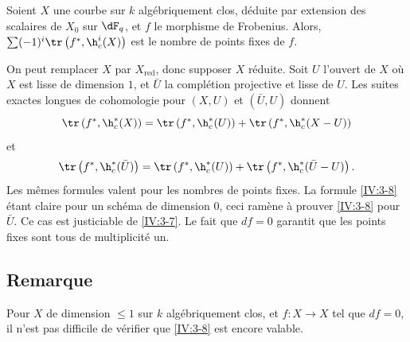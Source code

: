 \begin{corollary_}\label{IV:3-8}
Soient $X$ une courbe sur $k$ algébriquement clos, déduite par extension des 
scalaires de $X_0$ sur $\dF_q$, et $f$ le morphisme de Frobenius. Alors, 
$\sum (-1)^i \tr\left(f^\ast,\h_c^i(X)\right)$ est le nombre de points 
fixes de $f$.
\end{corollary_}

On peut remplacer $X$ par $X_\text{red}$, donc supposer $X$ réduite. Soit $U$ 
l'ouvert de $X$ où $X$ est lisse de dimension $1$, et $\bar U$ la 
complétion projective et lisse de $U$. Les suites exactes longues de 
cohomologie pour $(X,U)$ et $(\bar U,U)$ donnent 
\[
  \tr\left(f^\ast,\h_c^*(X)\right) = \tr\left(f^\ast,\h_c^*(U)\right) + \tr\left(f^\ast,\h_c^*(X-U)\right) 
\]
et
\[
  \tr\left(f^\ast,\h_c^*(\bar U)\right) = \tr\left(f^\ast,\h_c^*(U)\right) + \tr\left(f^\ast,\h_c^*(\bar U-U)\right) \text{.}
\]
Les mêmes formules valent pour les nombres de points fixes. La formule 
\ref{IV:3-8} étant claire pour un schéma de dimension $0$, ceci ramène 
à prouver \ref{IV:3-8} pour $\bar U$. Ce cas est justiciable de \ref{IV:3-7}. 
Le fait que $d f=0$ garantit que les points fixes sont tous de 
multiplicité un. 





\subsection{Remarque}\label{IV:3-9}

Pour $X$ de dimension $\leqslant 1$ sur $k$ algébriquement clos, et 
$f:X\to X$ tel que $d f=0$, il n'est pas difficile de vérifier que 
\ref{IV:3-8} est encore valable. 


